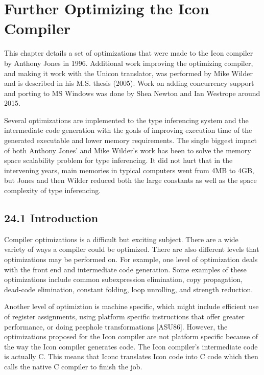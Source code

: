 \chapter{Further Optimizing the Icon Compiler}

This chapter details a set of optimizations that were made to the Icon
compiler by Anthony Jones in 1996. Additional work improving the
optimizing compiler, and making it work with the Unicon translator,
was performed by Mike Wilder and is described in his M.S. thesis (2005).
Work on adding concurrency support and porting to MS Windows was
done by Shea Newton and Ian Westrope around 2015.

Several optimizations are implemented to the type inferencing system
and the intermediate code generation with the goals of improving
execution time of the generated executable and lower memory
requirements. The single biggest impact of both Anthony Jones' and
Mike Wilder's work has been to solve the memory space scalability
problem for type inferencing. It did not hurt that in the intervening
years, main memories in typical computers went from 4MB to 4GB, but
Jones and then Wilder reduced both the large constants as well as the
space complexity of type inferencing.

\section[24.1 Introduction]{24.1 Introduction}

Compiler optimizations is a difficult but exciting subject. There are
a wide variety of ways a compiler could be optimized. There are also
different levels that optimizations may be performed on. For example,
one level of optimization deals with the front end and intermediate
code generation. Some examples of these optimizations include common
subexpression elimination, copy propagation, dead-code elimination,
constant folding, loop unrolling, and strength reduction.

Another level of optimiztion is machine specific, which might include
efficient use of register assignments, using platform specific
instructions that offer greater performance, or doing peephole
transformations [ASU86]. However, the optimizations proposed for the
Icon compiler are not platform specific because of the way the Icon
compiler generates code. The Icon compiler's intermediate code is
actually C. This means that Iconc translates Icon code into C code
which then calls the native C compiler to finish the job.

